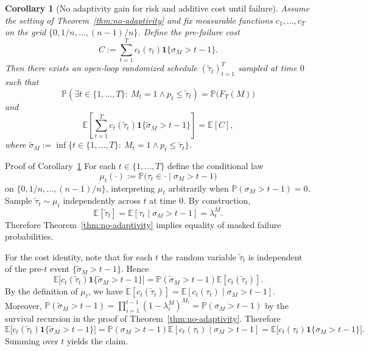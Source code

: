 \documentclass{uai2026} %
\newtheorem{corollary}[theorem]{Corollary}
\newcommand{\1}{\mathbf{1}}
\newcommand{\ind}[1]{\mathbf{1}\{#1\}}
\newcommand{\prob}{\mathbb{P}}
\newcommand{\expec}{\mathbb{E}}
\begin{document}
\begin{corollary}[No adaptivity gain for risk and additive cost until failure]
  \label{cor:no-adaptivity-cost}
  Assume the setting of Theorem~\ref{thm:no-adaptivity} and fix measurable functions $c_{1},\dots,c_{T}$ on the grid $\{0,1/n,\dots,(n-1)/n\}$.
  Define the pre-failure cost
  \begin{equation*}
    C := \sum_{t=1}^{T} c_{t}(\tau_{t})\ind{\sigma_{M}>t-1}.
  \end{equation*}
  Then there exists an open-loop randomized schedule $(\tilde{\tau}_{t})_{t=1}^{T}$ sampled at time $0$ such that
  \begin{equation*}
    \prob\left(\exists t\in\{1,\dots,T\}:\ M_{t}=1 \wedge p_{t}\le \tilde{\tau}_{t}\right)=\prob\bigl(F_{T}(M)\bigr)
  \end{equation*}
  and
  \begin{equation*}
    \expec\left[\sum_{t=1}^{T} c_{t}(\tilde{\tau}_{t})\ind{\tilde{\sigma}_{M}>t-1}\right]=\expec[C],
  \end{equation*}
  where $\tilde{\sigma}_{M}:=\inf\{t\in\{1,\dots,T\}:\ M_{t}=1 \wedge p_{t}\le \tilde{\tau}_{t}\}$.
\end{corollary}

\begin{appendixproof}{Proof of Corollary~\ref{cor:no-adaptivity-cost}}
  For each $t\in\{1,\dots,T\}$ define the conditional law
  \begin{equation*}
    \mu_{t}(\cdot) := \prob\bigl(\tau_{t}\in\cdot\mid \sigma_{M}>t-1\bigr)
  \end{equation*}
  on $\{0,1/n,\dots,(n-1)/n\}$, interpreting $\mu_{t}$ arbitrarily when $\prob(\sigma_{M}>t-1)=0$.
  Sample $\tilde{\tau}_{t}\sim\mu_{t}$ independently across $t$ at time $0$.
  By construction,
  \begin{equation*}
    \expec[\tilde{\tau}_{t}] = \expec[\tau_{t}\mid \sigma_{M}>t-1] = \lambda_{t}^{M}.
  \end{equation*}
  Therefore Theorem~\ref{thm:no-adaptivity} implies equality of masked failure probabilities.

  For the cost identity, note that for each $t$ the random variable $\tilde{\tau}_{t}$ is independent of the pre-$t$ event $\{\tilde{\sigma}_{M}>t-1\}$.
  Hence
  \begin{equation*}
    \expec\bigl[c_{t}(\tilde{\tau}_{t})\ind{\tilde{\sigma}_{M}>t-1}\bigr] = \prob(\tilde{\sigma}_{M}>t-1)\expec[c_{t}(\tilde{\tau}_{t})].
  \end{equation*}
  By the definition of $\mu_{t}$, we have $\expec[c_{t}(\tilde{\tau}_{t})]=\expec[c_{t}(\tau_{t})\mid \sigma_{M}>t-1]$.
  Moreover, $\prob(\tilde{\sigma}_{M}>t-1)=\prod_{i=1}^{t-1}(1-\lambda_{i}^{M})^{M_{i}}=\prob(\sigma_{M}>t-1)$ by the survival recursion in the proof of Theorem~\ref{thm:no-adaptivity}.
  Therefore
  \begin{equation*}
    \expec\bigl[c_{t}(\tilde{\tau}_{t})\ind{\tilde{\sigma}_{M}>t-1}\bigr]
    =
    \prob(\sigma_{M}>t-1)\expec[c_{t}(\tau_{t})\mid \sigma_{M}>t-1]
    =
    \expec\bigl[c_{t}(\tau_{t})\ind{\sigma_{M}>t-1}\bigr].
  \end{equation*}
  Summing over $t$ yields the claim.
\end{appendixproof}
\end{document}
